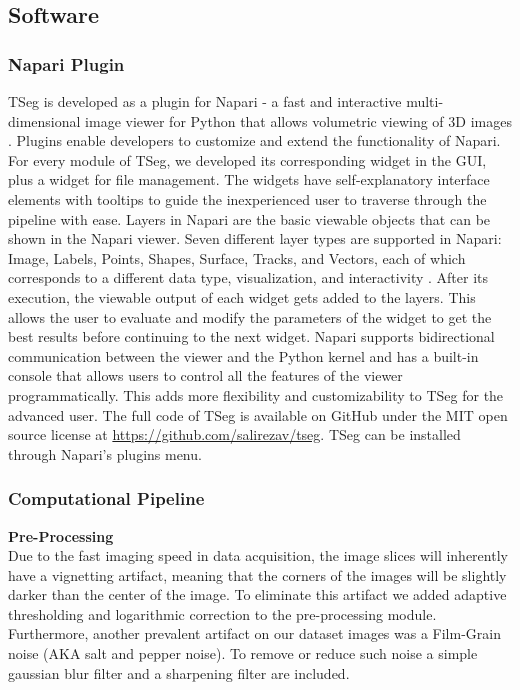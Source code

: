 \documentclass[./dissertation.tex]{subfiles}
\begin{document}
\subsection{Software}
\subsubsection{Napari Plugin}
TSeg is developed as a plugin for Napari - a fast and interactive multi-dimensional image viewer for Python that allows volumetric viewing of 3D images \cite{sofroniew_nicholas_2022_6598542}. Plugins enable developers to customize and extend the functionality of Napari. For every module of TSeg, we developed its corresponding widget in the GUI, plus a widget for file management. The widgets have self-explanatory interface elements with tooltips to guide the inexperienced user to traverse through the pipeline with ease. Layers in Napari are the basic viewable objects that can be shown in the Napari viewer. Seven different layer types are supported in Napari: Image, Labels, Points, Shapes, Surface, Tracks, and Vectors, each of which corresponds to a different data type, visualization, and interactivity \cite{sofroniew_nicholas_2022_6598542}. After its execution, the viewable output of each widget gets added to the layers. This allows the user to evaluate and modify the parameters of the widget to get the best results before continuing to the next widget. Napari supports bidirectional communication between the viewer and the Python kernel and has a built-in console that allows users to control all the features of the viewer programmatically. This adds more flexibility and customizability to TSeg for the advanced user. The full code of TSeg is available on GitHub under the MIT open source license at \url{https://github.com/salirezav/tseg}. TSeg can be installed through Napari's plugins menu.

\subsubsection{Computational Pipeline}
\textbf{Pre-Processing} \\
Due to the fast imaging speed in data acquisition, the image slices will inherently have a vignetting artifact, meaning that the corners of the images will be slightly darker than the center of the image. To eliminate this artifact we added adaptive thresholding and logarithmic correction to the pre-processing module. Furthermore, another prevalent artifact on our dataset images was a Film-Grain noise (AKA salt and pepper noise). To remove or reduce such noise a simple gaussian blur filter and a sharpening filter are included.
\end{document}
